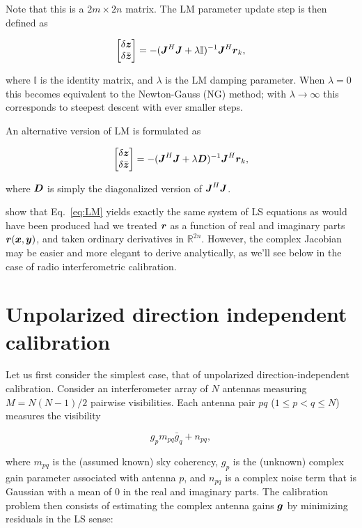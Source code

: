 \documentclass[useAMS,usenatbib]{mn2e}
\newcommand{\REAL}{\mathbb{R}}
\newcommand{\II}{\mathbb{I}}
\newcommand{\zz}{\bmath{z}}
\newcommand{\mat}[1]{{\bmath{#1}}}
\newcommand{\JJ}{\mat{J}} %
\newcommand{\DD}{\mat{D}}
\begin{document}
Note that this is a $2m \times 2n$ matrix. The LM parameter update step is then defined as

\begin{equation}
\label{eq:LM}
\Matrix{c}{\delta \zz \\ \delta \bar{\zz}} = -(\JJ^H \JJ + \lambda\II)^{-1}\JJ^H \bmath{r}_k,
\end{equation}

where $\II$ is the identity matrix, and $\lambda$ is the LM damping parameter. When $\lambda=0$ this becomes 
equivalent to the Newton-Gauss (NG) method; with $\lambda\to\infty$ this corresponds to steepest descent with ever smaller steps.

An alternative version of LM is formulated as

\begin{equation}
\label{eq:LM1}
\Matrix{c}{\delta \zz \\ \delta \bar{\zz}} = -(\JJ^H \JJ + \lambda \DD)^{-1}\JJ^H \bmath{r}_k,
\end{equation}

where $\DD$ is simply the diagonalized version of $\JJ^H\JJ$.

\citet{ComplexOpt} show that Eq.~\ref{eq:LM} yields exactly the same system of LS equations as would have 
been produced had we treated $\bmath{r}$ as a function of real and imaginary parts $\bmath{r}(\bmath{x},\bmath{y})$, 
and taken ordinary derivatives in $\REAL^{2n}$. However, the complex Jacobian may be easier and more elegant 
to derive analytically, as we'll see below in the case of radio interferometric calibration.

\section{Unpolarized direction independent calibration}

Let us first consider the simplest case, that of unpolarized direction-independent calibration. Consider an interferometer
array of $N$ antennas measuring $M=N(N-1)/2$ pairwise visibilities. Each antenna pair $pq$ ($1\leq p<q\leq N$) 
measures the visibility

\begin{equation}
\label{eq:RIME:unpol}
g_p m_{pq} \bar{g}_q + n_{pq},
\end{equation}

where $m_{pq}$ is the (assumed known) sky coherency, $g_p$ is the (unknown) complex gain parameter 
associated with antenna $p$, and $n_{pq}$ is a complex noise term that is Gaussian with a mean of 0 in the real and 
imaginary parts. The calibration problem then consists of estimating the complex antenna gains $\bmath{g}$ by
minimizing residuals in the LS sense:
\end{document}

